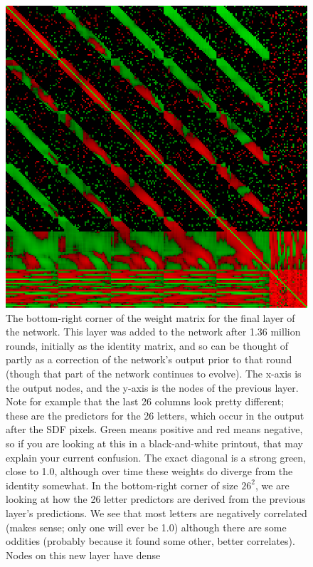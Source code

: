 \documentclass[twocolumn]{article} %
\begin{document}
\begin{figure}[ht]
\centering
  \includegraphics[width=0.99 \linewidth]{lastlayer}
  \caption{ The bottom-right corner of the weight matrix for the final
    layer of the network. This layer was added to the network after
    1.36 million rounds, initially as the identity matrix, and so can
    be thought of partly as a correction of the network's output prior
    to that round (though that part of the network continues to
    evolve). The x-axis is the output nodes, and the y-axis is the
    nodes of the previous layer. Note for example that the last 26
    columns look pretty different; these are the predictors for the 26
    letters, which occur in the output after the SDF pixels. Green
    means positive and red means negative, so if you are looking at
    this in a black-and-white printout, that may explain your current
    confusion. The exact diagonal is a strong green, close to 1.0,
    although over time these weights do diverge from the identity
    somewhat. In the bottom-right corner of size $26^2$, we are
    looking at how the 26 letter predictors are derived from the
    previous layer's predictions. We see that most letters are
    negatively correlated (makes sense; only one will ever be 1.0)
    although there are some oddities (probably because it found some
    other, better correlates). Nodes on this new layer have dense
}
\end{figure}
\end{document}
